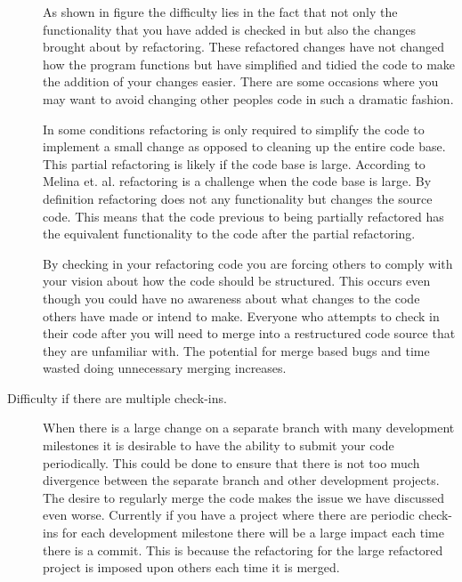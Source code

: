\begin{description}
    As shown in figure the difficulty lies in the fact that not only the functionality that you have added is checked in but also the changes brought about by refactoring.  These refactored changes have not changed how the program functions but have simplified and tidied the code to make the addition of your changes easier. There are some occasions where you may want to avoid changing other peoples code in such a dramatic fashion.  

    In some conditions refactoring is only required to simplify the code to implement a small change as opposed to cleaning up the entire code base.  This partial refactoring is likely if the code base is large. According to Melina et. al. \cite{Milea2014} refactoring is a challenge when the code base is large. By definition refactoring does not any functionality but changes the source code. This means that the code previous to being partially refactored has the equivalent functionality to the code after the partial refactoring.

    By checking in your refactoring code you are forcing others to comply with your vision about how the code should be structured.  This occurs even though you could have no awareness about what changes to the code others have made or intend to make.  Everyone who attempts to check in their code after you will need to merge into a restructured code source that they are unfamiliar with.  The potential for merge based bugs and time wasted doing unnecessary merging increases.

  \item [Difficulty if there are multiple check-ins.] 
    When there is a large change on a separate branch with many development milestones it is desirable to have the ability to submit your code periodically.  This could be done to ensure that there is not too much divergence between the separate branch and other development projects. The desire to regularly merge the code makes the issue we have discussed even worse. Currently if you have a project where there are periodic check-ins for each development milestone there will be a large impact each time there is a commit. This is because the refactoring for the large refactored project is imposed upon others each time it is merged.


\end{description}
